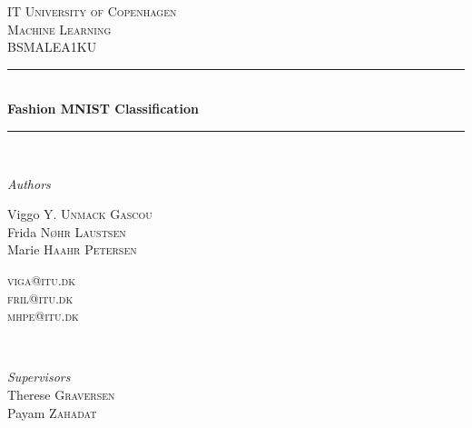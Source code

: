 \begin{titlepage} %
	\newcommand{\HRule}{\rule{\linewidth}{0.5mm}} %
	
	\center %
	
	
	\textsc{\LARGE IT University of Copenhagen}\\[1.5cm] %
	
	\textsc{\Large Machine Learning}\\[0.5cm] %
	
	\textsc{\small BSMALEA1KU}\\[0.5cm] %
	
	
	\HRule\\[0.4cm]
	
	{\huge\bfseries Fashion MNIST Classification}\\[0.4cm] %
	
	\HRule\\[1.5cm]
	
    \vfill

    \textit{Authors}

	\begin{minipage}{0.35\textwidth}
		\begin{flushleft}
			\large
			Viggo \textsc{Y. Unmack Gascou} \\ %
			Frida \textsc{Nøhr Laustsen} \\ %
            Marie \textsc{Haahr Petersen} \\
		\end{flushleft}
	\end{minipage}
 	\begin{minipage}{0.35\textwidth}
		\begin{flushright}
			\large
	        \textsc{viga@itu.dk} \\
			\textsc{fril@itu.dk} \\
            \textsc{mhpe@itu.dk} \\
		\end{flushright}
	\end{minipage}
	~
        \vfill 
	\begin{center}
		\large
		\textit{Supervisors} \\
		Therese \textsc{Graversen} \\
        Payam \textsc{Zahadat} \\
	\end{center}
	

\end{titlepage}
